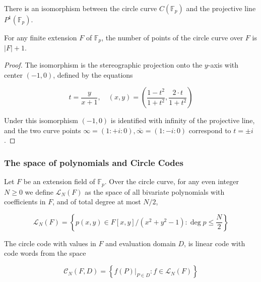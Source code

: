 \documentclass{beamer}
\begin{document}
\begin{frame}
	\begin{lemma}
		There is an isomorphism between the circle curve $C\left(\mathbb{F}_p\right)$ and the projective line $P^1\left(\mathbb{F}_p\right)$. 
		
		For any finite extension $F$ of $\mathbb{F}_p$, the number of points of the circle curve over $F$ is $|F|+1$.
	\end{lemma}
	 
\begin{proof}
	The isomorphism is the stereographic projection onto the $y$-axis with center $(-1,0)$, defined by the equations

$$
t=\frac{y}{x+1}, \quad(x, y)=\left(\frac{1-t^2}{1+t^2}, \frac{2 \cdot t}{1+t^2}\right)
$$


Under this isomorphism $(-1,0)$ is identified with infinity of the projective line, and the two curve points $\infty=(1:+i: 0), \bar{\infty}=(1:-i: 0)$  correspond to $t= \pm i$.
\end{proof}

\end{frame}

\begin{frame}
	\frametitle{The space of polynomials and Circle Codes}
	\begin{definition}
			Let $F$ be an extension field of $\mathbb{F}_p$. Over the circle curve, for any even integer $N \geq 0$ we define $\mathcal{L}_N(F)$ as the space of all bivariate polynomials with coefficients in $F$, and of total degree at most $N / 2$,

$$
\mathcal{L}_N(F)=\left\{p(x, y) \in F[x, y] /\left(x^2+y^2-1\right): \operatorname{deg} p \leq \frac{N}{2}\right\}
$$
	\end{definition}

\begin{definition}
	The circle code with values in $F$ and evaluation domain $D$, is linear code with code words from the space

$$
\mathcal{C}_N(F, D)=\left\{\left.f(P)\right|_{P \in D}: f \in \mathcal{L}_N(F)\right\}
$$

\end{definition}

\end{frame}
\end{document}
